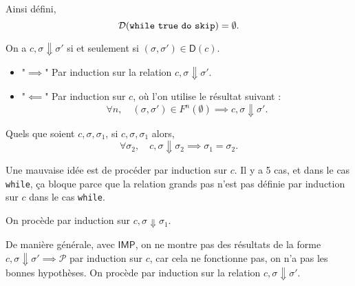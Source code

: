 \documentclass[../main]{subfiles}
\begin{document}
  \begin{exm}
    Ainsi défini, \[
      \mathcal{D}(\texttt{while}\ \texttt{true}\ \texttt{do}\ \texttt{skip}) = \emptyset
    .\]
  \end{exm}

  \begin{thm}
    On a $c, \sigma \Downarrow \sigma'$ si et seulement si $(\sigma, \sigma') \in \mathsf{D}(c)$.
  \end{thm}
  \begin{prv}
    \begin{itemize}
      \item "$\implies$" Par induction sur la relation $c, \sigma \Downarrow \sigma'$.
      \item "$\impliedby$" Par induction sur $c$,
        où l'on utilise le résultat suivant :
        \[
        \forall n, \quad (\sigma, \sigma') \in F^n(\emptyset) \implies c, \sigma  \Downarrow \sigma'
        .\]
    \end{itemize}
  \end{prv}

  \begin{lem}
    Quels que soient $c, \sigma, \sigma_1$, si $c, \sigma, \sigma_1$ alors, \[
    \forall \sigma_2, \quad c, \sigma \Downarrow \sigma_2 \implies \sigma_1 = \sigma_2
    .\]
  \end{lem}
  \begin{prv}
    Une mauvaise idée est de procéder par induction sur $c$.
    Il y a 5 cas, et dans le cas  \texttt{while}, ça bloque parce que la relation grands pas n'est pas définie par induction sur $c$ dans le cas \texttt{while}.

    On procède par induction sur $c, \sigma \Downarrow \sigma_1$.
  \end{prv}

  De manière générale, avec $\mathsf{IMP}$, on ne montre pas des résultats de la forme $c, \sigma \Downarrow \sigma' \implies \mathcal{P}$ par induction sur $c$, car cela ne fonctionne pas, on n'a pas les bonnes hypothèses.
  On procède par induction sur la relation $c, \sigma \Downarrow \sigma'$.
\end{document}

